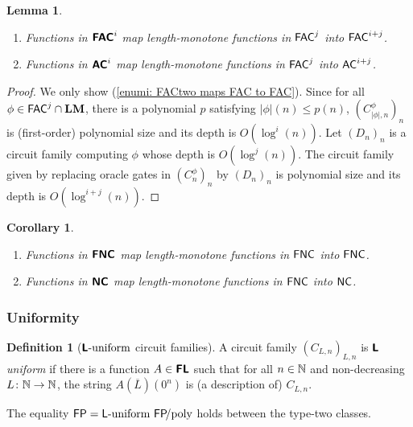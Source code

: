 \documentclass{article}
\newtheorem{lemma}[theorem]{Lemma}
\newtheorem{corollary}[theorem]{Corollary}
\theoremstyle{definition}
\newtheorem{definition}[theorem]{Definition}
\theoremstyle{remark}
\begin{document}
\begin{lemma}
\label{lemma:NCtwo-maps-NC-to-NC}
\mbox{}
\begin{enumerate}
 \item \label{enumi: FACtwo maps FAC to FAC}
Functions in $\text{\bfseries \sffamily \upshape FAC}^i$ map length-monotone functions in $\mathsf{FAC}^j$ into $\mathsf{FAC}^{i+j}$.
 \item Functions in $\text{\bfseries \sffamily \upshape AC}^i$ map length-monotone functions in $\mathsf{FAC}^j$ into $\mathsf{AC}^{i+j}$.
\end{enumerate}
\end{lemma}

\begin{proof}
We only show (\ref{enumi: FACtwo maps FAC to FAC}).
Since for all $\phi \in \mathsf{FAC}^j \cap \mathbf{LM}$, there is a polynomial $p$ satisfying $|\phi|(n) \le p(n)$, 
$(C^\phi_{|\phi|,n})_n$ is (first-order) polynomial size and its depth is $O(\log^i(n))$.
Let $(D_n)_n$ is a circuit family computing $\phi$ whose depth is $O(\log^j(n))$.
The circuit family given by replacing oracle gates in $(C^\phi_n)_n$ by $(D_n)_n$ is polynomial size and its depth is $O(\log^{i+j}(n))$.
\end{proof}

\begin{corollary}
\mbox{}
\begin{enumerate}
 \item Functions in $\text{\bfseries \sffamily \upshape FNC}$ map length-monotone functions in $\mathsf{FNC}$ into $\mathsf{FNC}$.
 \item Functions in $\text{\bfseries \sffamily \upshape NC}$ map length-monotone functions in $\mathsf{FNC}$ into $\mathsf{NC}$.
\end{enumerate} 
\end{corollary}


\subsubsection{Uniformity}

\begin{definition}[$\text{\bfseries \sffamily \upshape L}\text{-uniform}$ circuit families]
A circuit family $(C_{L,n})_{L,n}$ is \emph{$\text{\bfseries \sffamily \upshape L}$ uniform} if there is a function $A \in \text{\bfseries \sffamily \upshape FL}$ 
such that for all $n \in \mathbb N$ and non-decreasing $L \colon \mathbb N \to \mathbb N$, 
the string $A (\overline L) (0^n)$ is (a description of) $C_{L,n}$. 
\end{definition}

The equality $\classFP = \classL\uniform\ \classFP\!\text{/poly}$ holds
between the type-two classes.
\end{document}
